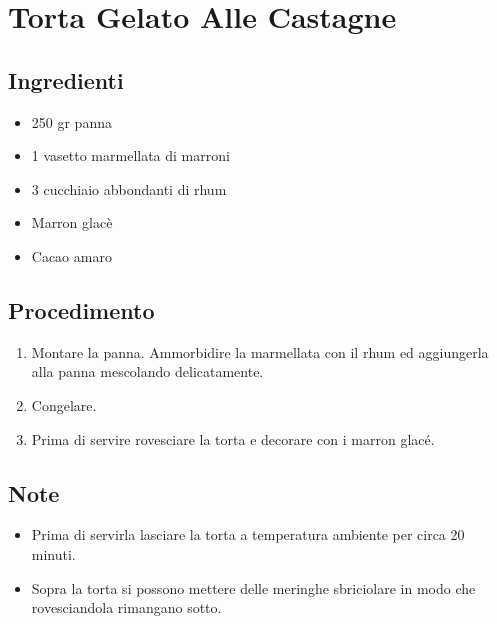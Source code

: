 \section{Torta Gelato Alle Castagne}
\subsection{Ingredienti}
\begin{itemize}
\item 250 gr panna   
\item 1 vasetto marmellata di marroni  
\item 3 cucchiaio abbondanti di rhum  
\item Marron glacè   
\item Cacao amaro
\end{itemize}
\subsection{Procedimento}
\begin{enumerate}
\item  Montare la panna. Ammorbidire la marmellata con il rhum ed aggiungerla alla panna mescolando delicatamente.  
\item  Congelare.  
\item  Prima di servire rovesciare la torta e decorare con i marron glacé.
\end{enumerate}
\subsection{Note}
\begin{itemize}
\item Prima di servirla lasciare la torta a temperatura ambiente per circa 20 minuti.  
\item Sopra la torta si possono mettere delle meringhe sbriciolare in modo che rovesciandola rimangano sotto.
\end{itemize}

